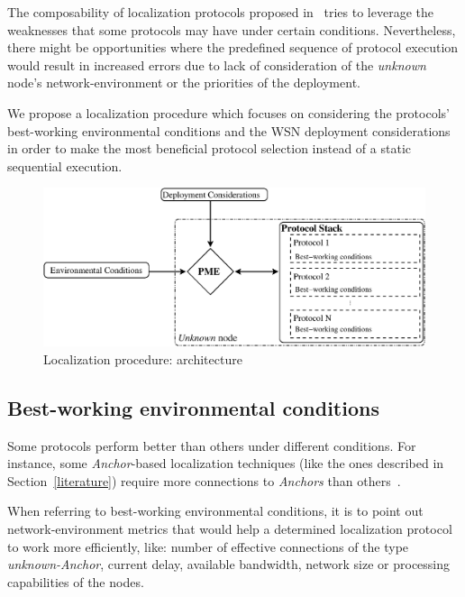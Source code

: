 The composability of localization protocols proposed in~\cite{composability} tries to leverage the weaknesses that some protocols may have under certain conditions. Nevertheless, there might be opportunities where the predefined sequence of protocol execution would result in increased errors due to lack of consideration of the \emph{unknown} node's network-environment or the priorities of the deployment.

We propose a localization procedure which focuses on considering the protocols' best-working environmental conditions and the WSN deployment considerations in order to make the most beneficial protocol selection instead of a static sequential execution.


\begin{figure}[tb]
  \centering
  \includegraphics[width=\linewidth]{section3/figures/LocProc_small.eps}
  \caption{Localization procedure: architecture
  \label{fig:LocProc}}
\end{figure}

\subsection{Best-working environmental conditions}\label{bestWorkingConditions}
Some protocols perform better than others under different conditions. For instance, some \emph{Anchor}-based localization techniques (like the ones described in Section~\ref{literature}) require more connections to \emph{Anchors} than others~\cite{rang:loc:techniques}.

When referring to best-working environmental conditions, it is to point out network-environment metrics that would help a determined localization protocol to work more efficiently, like: number of effective connections of the type \emph{unknown-Anchor}, current delay, available bandwidth, network size or processing capabilities of the nodes.

